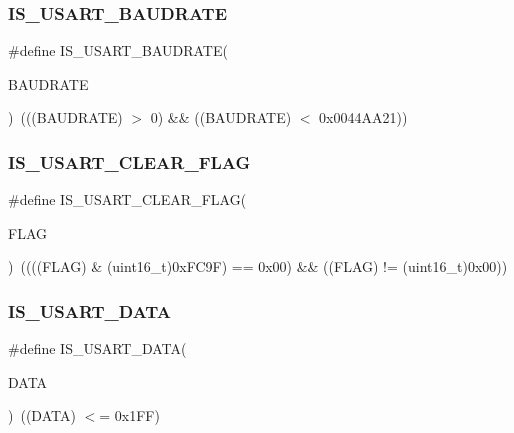\mbox{\label{group___u_s_a_r_t___flags_ga9dc365e0a1e01031a8e0757a34b9d420}} 
\subsubsection{\texorpdfstring{IS\_USART\_BAUDRATE}{IS\_USART\_BAUDRATE}}
{\footnotesize\ttfamily \#define I\+S\+\_\+\+U\+S\+A\+R\+T\+\_\+\+B\+A\+U\+D\+R\+A\+TE(\begin{DoxyParamCaption}\item[{}]{B\+A\+U\+D\+R\+A\+TE }\end{DoxyParamCaption})~(((B\+A\+U\+D\+R\+A\+TE) $>$ 0) \&\& ((B\+A\+U\+D\+R\+A\+TE) $<$ 0x0044\+A\+A21))}

\mbox{\label{group___u_s_a_r_t___flags_gadc905fdce8defba31c00c95554a26bc3}} 
\subsubsection{\texorpdfstring{IS\_USART\_CLEAR\_FLAG}{IS\_USART\_CLEAR\_FLAG}}
{\footnotesize\ttfamily \#define I\+S\+\_\+\+U\+S\+A\+R\+T\+\_\+\+C\+L\+E\+A\+R\+\_\+\+F\+L\+AG(\begin{DoxyParamCaption}\item[{}]{F\+L\+AG }\end{DoxyParamCaption})~((((F\+L\+AG) \& (uint16\+\_\+t)0x\+F\+C9\+F) == 0x00) \&\& ((\+F\+L\+A\+G) != (uint16\+\_\+t)0x00))}

\mbox{\label{group___u_s_a_r_t___flags_gafd6307e41818e076d31f3c24cb5ba135}} 
\subsubsection{\texorpdfstring{IS\_USART\_DATA}{IS\_USART\_DATA}}
{\footnotesize\ttfamily \#define I\+S\+\_\+\+U\+S\+A\+R\+T\+\_\+\+D\+A\+TA(\begin{DoxyParamCaption}\item[{}]{D\+A\+TA }\end{DoxyParamCaption})~((D\+A\+TA) $<$= 0x1\+F\+F)}

